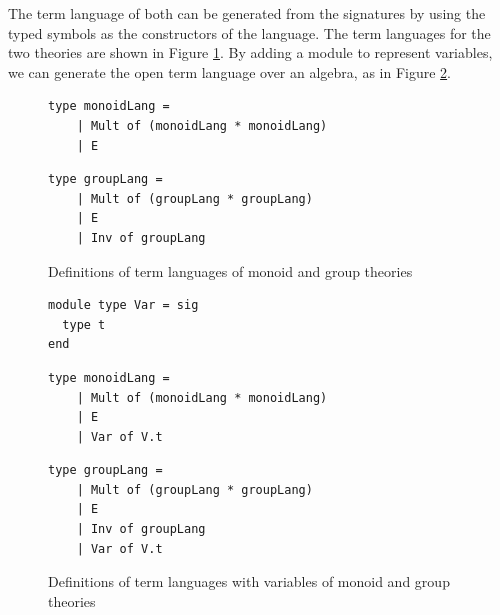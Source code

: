 The term language of both can be generated from the signatures by using the typed symbols as the 
constructors of the language. The term languages for the two theories are shown in Figure 
\ref{fig:languages}. By adding a module to represent variables, we can generate the open term 
language over an algebra, as in Figure \ref{fig:languages_w_vars}. 
\begin{figure}
	\begin{minipage}[t]{0.5\textwidth}
		\begin{verbatim}
type monoidLang = 
    | Mult of (monoidLang * monoidLang)
    | E
		\end{verbatim}
	\end{minipage}%
	\begin{minipage}[t]{0.5\textwidth}
		\begin{verbatim}
type groupLang = 
    | Mult of (groupLang * groupLang)
    | E
    | Inv of groupLang
		\end{verbatim}
	\end{minipage}%
	\caption{Definitions of term languages of monoid and group theories}
	\label{fig:languages}
\end{figure}
\begin{figure}[h]
	\begin{Verbatim}
module type Var = sig 
  type t 
end 
	\end{Verbatim}
	\begin{minipage}[t]{0.5\textwidth}
	\begin{Verbatim}
type monoidLang = 
    | Mult of (monoidLang * monoidLang)
    | E
    | Var of V.t
	\end{Verbatim}
\end{minipage}%
\begin{minipage}[t]{0.5\textwidth}
	\begin{Verbatim}
type groupLang = 
    | Mult of (groupLang * groupLang)
    | E
    | Inv of groupLang
    | Var of V.t
	\end{Verbatim}
\end{minipage}%
\caption{Definitions of term languages with variables of monoid and group theories}
\label{fig:languages_w_vars}
\end{figure}

